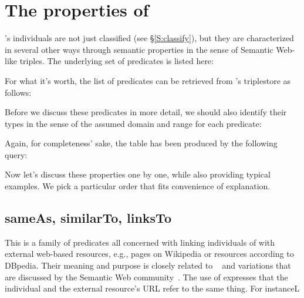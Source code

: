 
\section{The properties of \solasote}
\label{S:properties}

\solasote's individuals are not just classified (see
\S\ref{S:classify}), but they are characterized in several other ways
through semantic properties in the sense of Semantic Web-like
triples. The underlying set of predicates is listed here:


\noindent
For what it's worth, the list of predicates can be retrieved from
\solasote's triplestore as follows:


\noindent
Before we discuss these predicates in more detail, we should also
identify their types in the sense of the assumed domain and range for
each predicate:


\noindent
Again, for completeness' sake, the table has been produced by the
following query:


\noindent
Now let's discuss these properties one by one, while also providing
typical examples. We pick a particular order that fits convenience of
explanation.


\subsection{sameAs, similarTo, linksTo} 
\label{S:sameAs}
\label{S:similarTo}
\label{S:linksTo}
 
This is a family of predicates all concerned with linking individuals
of \solasote{} with external web-based resources, e.g., pages on
Wikipedia or resources according to DBpedia. Their meaning and purpose
is closely related to ~\cite{owl} and variations that
are discussed by the Semantic Web community~\cite{HalpinHT11}. The use
of  expresses that the \solasote{} individual and the
external resource's URL refer to the same thing. For instanceL

